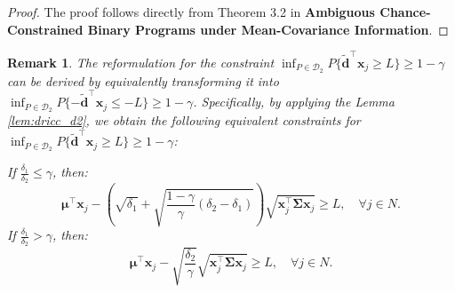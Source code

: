 \documentclass[preprint,12pt,authoryear]{elsarticle}
\newtheorem{remark}{Remark}
\begin{document}
\begin{proof}
The proof follows directly from Theorem 3.2 in \textbf{Ambiguous Chance-Constrained Binary Programs under Mean-Covariance Information}.
\end{proof}

\begin{remark}\label{rem:dricc_d2_lower}
The reformulation for the constraint $\inf_{P \in \mathcal{D}_2} P \{\widetilde{\mathbf{d}}^\top \mathbf{x}_j \geqslant L\} \geqslant 1 - \gamma$ can be derived by equivalently transforming it into $\inf_{P \in \mathcal{D}_2} P \{ - \widetilde{\mathbf{d}}^\top \mathbf{x}_j \leqslant -L\} \geqslant 1 - \gamma$. Specifically, by applying the Lemma \ref{lem:dricc_d2}, we obtain the following equivalent constraints for $\inf_{P \in \mathcal{D}_2} P \{\widetilde{\mathbf{d}}^\top \mathbf{x}_j \geqslant L\} \geqslant 1 - \gamma$:

If $\frac{\delta_1}{\delta_2} \leqslant \gamma$, then:
\begin{equation}
\boldsymbol{\mu}^\top \mathbf{x}_j - \left(\sqrt{\delta_1} + \sqrt{\frac{1 - \gamma}{\gamma} (\delta_2 - \delta_1)}\right) \sqrt{\mathbf{x}_j^\top \boldsymbol{\Sigma} \mathbf{x}_j} \geqslant L, \quad \forall j \in N.
\end{equation}
If $\frac{\delta_1}{\delta_2} > \gamma$, then:
\begin{equation}
\boldsymbol{\mu}^\top \mathbf{x}_j - \sqrt{\frac{\delta_2}{\gamma}} \sqrt{\mathbf{x}_j^\top \boldsymbol{\Sigma} \mathbf{x}_j} \geqslant L, \quad \forall j \in N.
\end{equation}
\end{remark}
\end{document}
